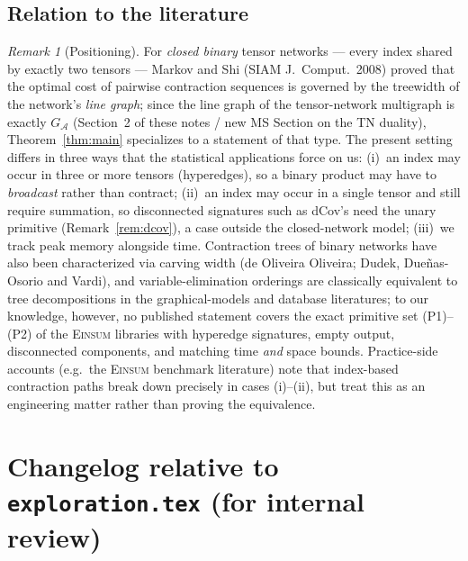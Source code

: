 \documentclass[11pt]{article}
\newcommand{\Einsum}{\textsc{Einsum}}
\newcommand{\calA}{\mathcal{A}}
\newcommand{\graphform}[1]{G_{#1}}
\theoremstyle{plain}
\theoremstyle{definition}
\theoremstyle{remark}
\newtheorem{remark}{Remark}
\begin{document}
\subsection{Relation to the literature}

\begin{remark}[Positioning]
\label{rem:lit}
For \emph{closed binary} tensor networks --- every index shared by
exactly two tensors --- Markov and Shi (SIAM J.\ Comput.\ 2008) proved
that the optimal cost of pairwise contraction sequences is governed by
the treewidth of the network's \emph{line graph}; since the line graph of
the tensor-network multigraph is exactly $\graphform{\calA}$ (Section~2
of these notes / new MS Section on the TN duality), Theorem~\ref{thm:main}
specializes to a statement of that type.  The present setting differs in
three ways that the statistical applications force on us: (i)~an index
may occur in three or more tensors (hyperedges), so a binary product may
have to \emph{broadcast} rather than contract; (ii)~an index may occur in
a single tensor and still require summation, so disconnected signatures
such as dCov's need the unary primitive (Remark~\ref{rem:dcov}), a case
outside the closed-network model; (iii)~we track peak memory alongside
time.  Contraction trees of binary networks have also been characterized
via carving width (de Oliveira Oliveira; Dudek, Due\~nas-Osorio and
Vardi), and variable-elimination orderings are classically equivalent to
tree decompositions in the graphical-models and database literatures; to
our knowledge, however, no published statement covers the exact primitive
set (P1)--(P2) of the \Einsum{} libraries with hyperedge signatures,
empty output, disconnected components, and matching time \emph{and}
space bounds.  Practice-side accounts (e.g.\ the \Einsum{} benchmark
literature) note that index-based contraction paths break down precisely
in cases (i)--(ii), but treat this as an engineering matter rather than
proving the equivalence.
\end{remark}

\section*{Changelog relative to \texttt{exploration.tex} (for internal review)}
\end{document}
